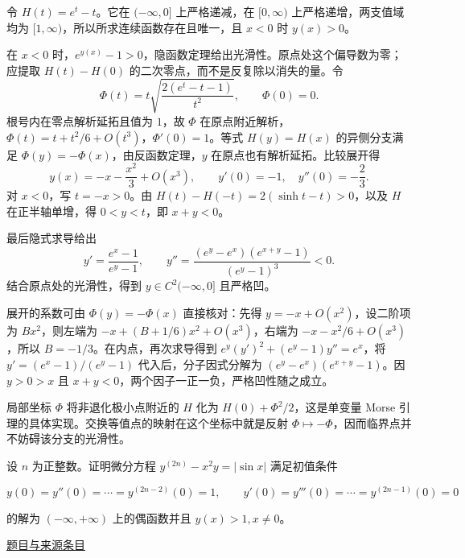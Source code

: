 \documentclass[UTF8,12pt,a4paper,fontset=fandol]{ctexart}
\begin{document}
\begin{solve}\label{ans:fin13-low:9}

令 $H(t)=e^t-t$。它在 $(-\infty,0]$ 上严格递减，在 $[0,\infty)$ 上严格递增，两支值域均为 $[1,\infty)$，所以所求连续函数存在且唯一，且 $x<0$ 时 $y(x)>0$。

在 $x<0$ 时，$e^{y(x)}-1>0$，隐函数定理给出光滑性。原点处这个偏导数为零；应提取 $H(t)-H(0)$ 的二次零点，而不是反复除以消失的量。令
\[
\Phi(t)=t\sqrt{\frac{2(e^t-t-1)}{t^2}},\qquad \Phi(0)=0.
\]
根号内在零点解析延拓且值为 $1$，故 $\Phi$ 在原点附近解析，$\Phi(t)=t+t^2/6+O(t^3)$，$\Phi'(0)=1$。等式 $H(y)=H(x)$ 的异侧分支满足 $\Phi(y)=-\Phi(x)$，由反函数定理，$y$ 在原点也有解析延拓。比较展开得
\[
y(x)=-x-\frac{x^2}{3}+O(x^3),
\qquad y'(0)=-1,\quad y''(0)=-\frac23.
\]
对 $x<0$，写 $t=-x>0$。由 $H(t)-H(-t)=2(\sinh t-t)>0$，以及 $H$ 在正半轴单增，得 $0<y<t$，即 $x+y<0$。

最后隐式求导给出
\[
y'=\frac{e^x-1}{e^y-1},\qquad
 y''=\frac{(e^y-e^x)(e^{x+y}-1)}{(e^y-1)^3}<0.
\]
结合原点处的光滑性，得到 $y\in C^2(-\infty,0]$ 且严格凹。

展开的系数可由 $\Phi(y)=-\Phi(x)$ 直接核对：先得 $y=-x+O(x^2)$，设二阶项为 $Bx^2$，则左端为 $-x+(B+1/6)x^2+O(x^3)$，右端为 $-x-x^2/6+O(x^3)$，所以 $B=-1/3$。在内点，再次求导得到 $e^y(y')^2+(e^y-1)y''=e^x$，将 $y'=(e^x-1)/(e^y-1)$ 代入后，分子因式分解为 $(e^y-e^x)(e^{x+y}-1)$。因 $y>0>x$ 且 $x+y<0$，两个因子一正一负，严格凹性随之成立。

\end{solve}

\begin{remark}[方法与条件]局部坐标 $\Phi$ 将非退化极小点附近的 $H$ 化为 $H(0)+\Phi^2/2$，这是单变量 Morse 引理的具体实现。交换等值点的映射在这个坐标中就是反射 $\Phi\mapsto-\Phi$，因而临界点并不妨碍该分支的光滑性。\end{remark}

\begin{example}\label{ex:fin13-low:10}\label{pr:fin13-low:10}

设 $n$ 为正整数。证明微分方程 $y^{(2n)} - x^{2} y = |\sin x|$ 满足初值条件

\[
y(0) = y''(0) = \cdots = y^{(2n-2)}(0) = 1, \qquad y'(0) = y'''(0) = \cdots = y^{(2n-1)}(0) = 0
\]

的解为 $(-\infty, +\infty)$ 上的偶函数并且 $y(x) > 1, x \neq 0$。

\par\href{https://github.com/lzxcr/cmc-mathematics/blob/64916fa1fdbc3e444a652eca204d5669058ee321/src/problems/finals/13/12.md}{题目与来源条目}

\end{example}
\end{document}
